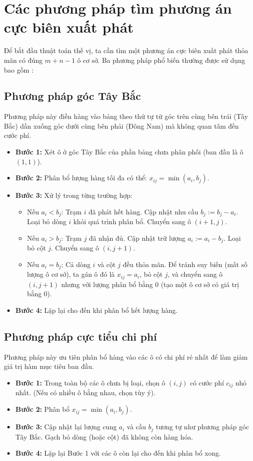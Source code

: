 \documentclass[../main.tex]{subfiles}
\begin{document}
\section{Các phương pháp tìm phương án cực biên xuất phát}
Để bắt đầu thuật toán thế vị, ta cần tìm một phương án cực biên xuất phát thỏa mãn có đúng $m+n-1$ ô cơ sở. Ba phương pháp phổ biến thường được sử dụng bao gồm \cite{bachkim}:

\subsection{Phương pháp góc Tây Bắc}
Phương pháp này điền hàng vào bảng theo thứ tự từ góc trên cùng bên trái (Tây Bắc) dần xuống góc dưới cùng bên phải (Đông Nam) mà không quan tâm đến cước phí.
\begin{itemize}
    \item \textbf{Bước 1:} Xét ô ở góc Tây Bắc của phần bảng chưa phân phối (ban đầu là ô $(1,1)$).
    \item \textbf{Bước 2:} Phân bổ lượng hàng tối đa có thể: $x_{ij} = \min(a_i, b_j)$.
    \item \textbf{Bước 3:} Xử lý trong từng trường hợp:
        \begin{itemize}
            \item Nếu $a_i < b_j$: Trạm $i$ đã phát hết hàng. Cập nhật nhu cầu $b_j := b_j - a_i$. Loại bỏ dòng $i$ khỏi quá trình phân bổ. Chuyển sang ô $(i+1, j)$.
            \item Nếu $a_i > b_j$: Trạm $j$ đã nhận đủ. Cập nhật trữ lượng $a_i := a_i - b_j$. Loại bỏ cột $j$. Chuyển sang ô $(i, j+1)$.
            \item Nếu $a_i = b_j$: Cả dòng $i$ và cột $j$ đều thỏa mãn. Để tránh suy biến (mất số lượng ô cơ sở), ta gán ô đó là $x_{ij} = a_i$, bỏ cột $j$, và chuyển sang ô $(i, j+1)$ nhưng với lượng phân bổ bằng $0$ (tạo một ô cơ sở có giá trị bằng 0).
        \end{itemize}
    \item \textbf{Bước 4:} Lặp lại cho đến khi phân bổ hết lượng hàng.
\end{itemize}

\subsection{Phương pháp cực tiểu chi phí}
Phương pháp này ưu tiên phân bổ hàng vào các ô có chi phí rẻ nhất để làm giảm giá trị hàm mục tiêu ban đầu.
\begin{itemize}
    \item \textbf{Bước 1:} Trong toàn bộ các ô chưa bị loại, chọn ô $(i,j)$ có cước phí $c_{ij}$ nhỏ nhất. (Nếu có nhiều ô bằng nhau, chọn tùy ý).
    \item \textbf{Bước 2:} Phân bổ $x_{ij} = \min(a_i, b_j)$.
    \item \textbf{Bước 3:} Cập nhật lại lượng cung $a_i$ và cầu $b_j$ tương tự như phương pháp góc Tây Bắc. Gạch bỏ dòng (hoặc cột) đã không còn hàng hóa.
    \item \textbf{Bước 4:} Lặp lại Bước 1 với các ô còn lại cho đến khi phân bổ xong.
\end{itemize}
\end{document}

